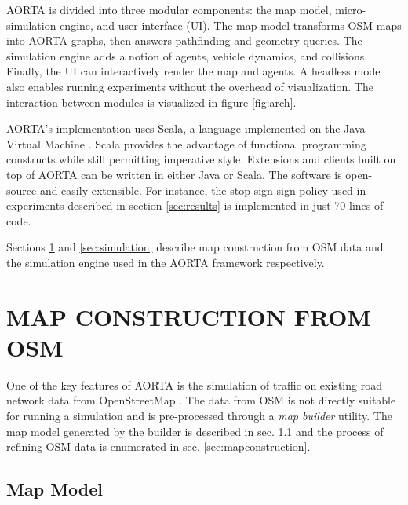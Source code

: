 \documentclass[letterpaper, 10 pt, conference]{ieeeconf}  %
\begin{document}
AORTA is divided into three modular components: the map model, micro-simulation
engine, and user interface (UI). The map model transforms OSM maps into AORTA
graphs, then answers pathfinding and geometry queries. The simulation engine
adds a notion of agents, vehicle dynamics, and collisions. Finally, the UI can
interactively render the map and agents. A headless mode also enables running
experiments without the overhead of visualization. The interaction between
modules is visualized in figure \ref{fig:arch}.

AORTA's implementation uses Scala, a language implemented on the Java Virtual
Machine \cite{scala}. Scala provides the advantage of functional programming
constructs while still permitting imperative style.  Extensions and clients
built on top of AORTA can be written in either Java or Scala. The software is
open-source and easily extensible. For instance, the stop sign sign policy used
in experiments described in section \ref{sec:results} is implemented in just 70
lines of code. 

Sections \ref{sec:map} and \ref{sec:simulation} describe map construction from
OSM data and the simulation engine used in the AORTA framework respectively.


\section{MAP CONSTRUCTION FROM OSM}
\label{sec:map}

One of the key features of AORTA is the simulation of traffic on existing road
network data from OpenStreetMap \cite{osm}. The data from OSM is not directly
suitable for running a simulation and is pre-processed through a \emph{map
builder} utility. The map model generated by the builder is described in sec.
\ref{sec:mapmodel} and the process of refining OSM data is enumerated in sec.
\ref{sec:mapconstruction}.

\subsection{Map Model}
\label{sec:mapmodel}

\end{document}
